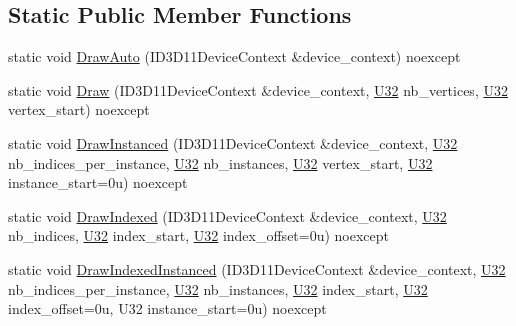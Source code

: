 \subsection*{Static Public Member Functions}
\begin{DoxyCompactItemize}
\item 
static void \mbox{\hyperlink{structmage_1_1rendering_1_1_pipeline_a30cdc51051e3fcab0d3a9c36efad40e4}{Draw\+Auto}} (I\+D3\+D11\+Device\+Context \&device\+\_\+context) noexcept
\item 
static void \mbox{\hyperlink{structmage_1_1rendering_1_1_pipeline_acc764fee84589a85e0e2df129b34b137}{Draw}} (I\+D3\+D11\+Device\+Context \&device\+\_\+context, \mbox{\hyperlink{namespacemage_a41c104c036fba3756a74e19f793eeaa1}{U32}} nb\+\_\+vertices, \mbox{\hyperlink{namespacemage_a41c104c036fba3756a74e19f793eeaa1}{U32}} vertex\+\_\+start) noexcept
\item 
static void \mbox{\hyperlink{structmage_1_1rendering_1_1_pipeline_af0d8580b1c0a672c3fc9558dc19408a3}{Draw\+Instanced}} (I\+D3\+D11\+Device\+Context \&device\+\_\+context, \mbox{\hyperlink{namespacemage_a41c104c036fba3756a74e19f793eeaa1}{U32}} nb\+\_\+indices\+\_\+per\+\_\+instance, \mbox{\hyperlink{namespacemage_a41c104c036fba3756a74e19f793eeaa1}{U32}} nb\+\_\+instances, \mbox{\hyperlink{namespacemage_a41c104c036fba3756a74e19f793eeaa1}{U32}} vertex\+\_\+start, \mbox{\hyperlink{namespacemage_a41c104c036fba3756a74e19f793eeaa1}{U32}} instance\+\_\+start=0u) noexcept
\item 
static void \mbox{\hyperlink{structmage_1_1rendering_1_1_pipeline_a8be1904461ee6bcd5e4b5b72d5cb79a8}{Draw\+Indexed}} (I\+D3\+D11\+Device\+Context \&device\+\_\+context, \mbox{\hyperlink{namespacemage_a41c104c036fba3756a74e19f793eeaa1}{U32}} nb\+\_\+indices, \mbox{\hyperlink{namespacemage_a41c104c036fba3756a74e19f793eeaa1}{U32}} index\+\_\+start, \mbox{\hyperlink{namespacemage_a41c104c036fba3756a74e19f793eeaa1}{U32}} index\+\_\+offset=0u) noexcept
\item 
static void \mbox{\hyperlink{structmage_1_1rendering_1_1_pipeline_a23ab5aea07be3bca0d9d7900518104b7}{Draw\+Indexed\+Instanced}} (I\+D3\+D11\+Device\+Context \&device\+\_\+context, \mbox{\hyperlink{namespacemage_a41c104c036fba3756a74e19f793eeaa1}{U32}} nb\+\_\+indices\+\_\+per\+\_\+instance, \mbox{\hyperlink{namespacemage_a41c104c036fba3756a74e19f793eeaa1}{U32}} nb\+\_\+instances, \mbox{\hyperlink{namespacemage_a41c104c036fba3756a74e19f793eeaa1}{U32}} index\+\_\+start, \mbox{\hyperlink{namespacemage_a41c104c036fba3756a74e19f793eeaa1}{U32}} index\+\_\+offset=0u, U32 instance\+\_\+start=0u) noexcept

\end{DoxyCompactItemize}
